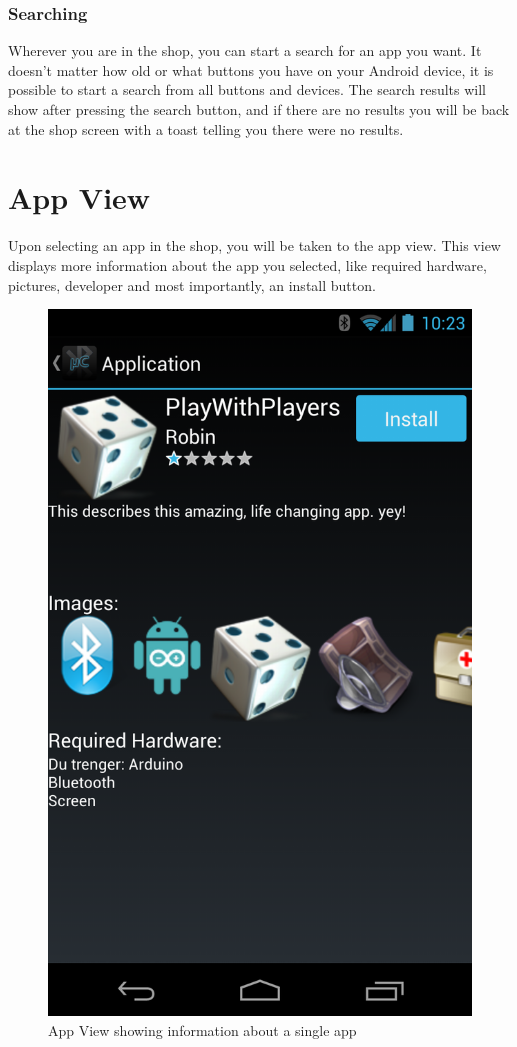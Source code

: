 \subsection{Searching}
Wherever you are in the shop, you can start a search for an app you want. It doesn't matter how old or what buttons you have on your Android device, it is possible to start a search from all buttons and devices. The search results will show after pressing the search button, and if there are no results you will be back at the shop screen with a toast telling you there were no results.

\chapter{App View}
Upon selecting an app in the shop, you will be taken to the app view. This view displays more information about the app you selected, like required hardware, pictures, developer and most importantly, an install button. 
\newline
\begin{figure}[H]
	\centering
	\includegraphics[scale = 0.3]{images/Screenshots/app_view.png}
	\caption{App View showing information about a single app}
\end{figure}
